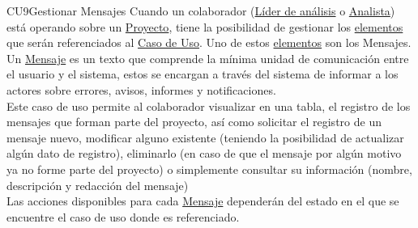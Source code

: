 	\begin{UseCase}{CU9}{Gestionar Mensajes}{
		Cuando un colaborador (\hyperlink{jefe}{Líder de análisis} o \hyperlink{analista}{Analista}) está operando sobre un \hyperlink{proyectoEntidad}{Proyecto}, tiene la posibilidad de gestionar los \hyperlink{tElemento}{elementos} que serán referenciados al \hyperlink{casoUso}{Caso de Uso}. Uno de estos \hyperlink{tElemento}{elementos} son los Mensajes.\\
		
		Un \hyperlink{MSGEntidad}{Mensaje} es un texto que comprende la mínima unidad de comunicación entre el usuario y el sistema, estos se encargan a través del sistema de informar a los actores sobre errores, avisos, informes y notificaciones.\\
		
		Este caso de uso permite al colaborador visualizar en una tabla, el registro de los mensajes que forman parte del proyecto, así como solicitar el registro de un mensaje nuevo, modificar alguno existente (teniendo la posibilidad de actualizar algún dato de registro), eliminarlo (en caso de que el mensaje por algún motivo ya no forme parte del proyecto) o simplemente consultar su información (nombre, descripción y redacción del mensaje) \\
		Las acciones disponibles para cada \hyperlink{MSGEntidad}{Mensaje} dependerán del estado en el que se encuentre el caso de uso donde es referenciado. 
	}

	
\end{UseCase}
